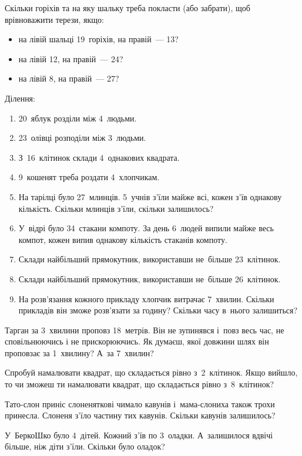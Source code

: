 \problem
Скільки горіхів та на яку шальку треба покласти (або забрати),
щоб врівноважити терези, якщо:
\begin{itemize}
    \item на лівій шальці 19~горіхів, на правій~--- 13?
    \item на лівій 12, на правій~--- 24?
    \item на лівій 8, на правій~--- 27?
\end{itemize}


\problem
Ділення:
\begin{enumerate}
    \item 20~яблук розділи між 4~людьми.
    \item 23~олівці розподіли між 3~людьми.
    \item З~16~клітинок склади 4~однакових квадрата.
    \item 9~кошенят треба роздати 4~хлопчикам.
    \item На тарілці було 27~млинців. 5~учнів з'їли майже всі,
    кожен з'їв однакову кількість.
    Скільки млинців з'їли, скільки залишилось?
    \item У~відрі було 34~стакани компоту.
    За день 6~людей випили майже весь компот,
    кожен випив однакову кількість стаканів компоту.
    \item Склади найбільший прямокутник, використавши
    не~більше 23~клітинок.
    \item Склади найбільший прямокутник, використавши
    не~більше 26~клітинок.
    \item На розв'язання кожного прикладу хлопчик витрачає 7~хвилин.
    Скільки прикладів він зможе розв'язати за годину?
    Скільки часу в~нього залишиться?
\end{enumerate}


\problem
Тарган за 3~хвилини проповз 18~метрів.
Він не зупинявся і~повз весь час, не сповільнюючись і не прискорюючись.
Як думаєш, якої довжини шлях він проповзає за 1~хвилину?
А~за 7~хвилин?


\problem
Спробуй намалювати квадрат, що складається рівно з~2~клітинок.
Якщо вийшло, то чи зможеш ти намалювати квадрат,
що складається рівно з~8~клітинок?


\problem
Тато-слон приніс слоненяткові чимало кавунів
і~мама-слониха також трохи принесла.
Слоненя з’їло частину тих кавунів.
Скільки кавунів залишилось?


\problem
У~БеркоШко було 4~дітей. Кожний з’їв по 3~оладки.
А~залишилося вдвічі більше, ніж діти з’їли.
Скільки було оладок?



